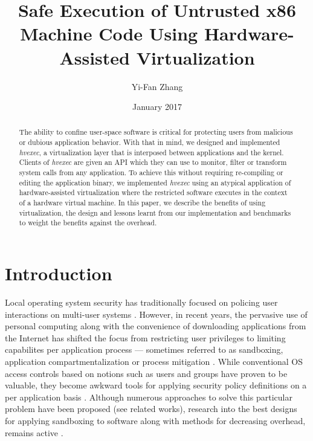 \documentclass{article}
\title{Safe Execution of Untrusted x86 Machine Code Using Hardware-Assisted Virtualization}
\author{Yi-Fan Zhang}
\date{January 2017}
\newcommand{\PROJNAME}{\textit{hvexec}}
\begin{document}
\maketitle

\begin{abstract}
The ability to confine user-space software is critical for protecting users from
malicious or dubious application behavior.
With that in mind, we designed and implemented \PROJNAME{}, a virtualization layer that is interposed between applications and the kernel. Clients of \PROJNAME{} are given an API which they can use to monitor, filter or transform system calls from any application. To achieve this without requiring re-compiling or editing the application binary, we implemented \PROJNAME{} using an atypical application of hardware-assisted virtualization
where the restricted software executes in the context of a hardware virtual machine.
In this paper, we describe the benefits of using virtualization, the design and lessons learnt from our implementation and benchmarks to 
weight the benefits against the overhead.
\end{abstract}

\section{Introduction}
Local operating system security has traditionally focused on policing user interactions on multi-user systems \cite{DesignImplFreeBSD}.
However, in recent years, the pervasive use of personal computing along with the convenience of downloading
applications from the Internet has shifted the focus from restricting user privileges to limiting capabilites per application process
— sometimes referred to as sandboxing, application compartmentalization or process mitigation \cite{DesignImplFreeBSD}.
While conventional OS access controls based on notions such as users and groups have proven to be valuable,
they become awkward tools for applying security policy definitions on a per application basis \cite{DesignImplFreeBSD}.
Although numerous approaches to solve this particular problem have been proposed (see related works),
research into the best designs for applying sandboxing to software along with methods for decreasing overhead, remains active \cite{Ayer2012,VCall2010,DesignImplFreeBSD}.
\end{document}
